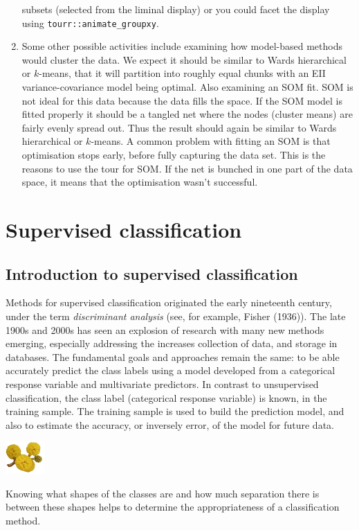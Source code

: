 \documentclass[
  letterpaper,
]{krantz}
\newcommand{\infobox}[1]{%
\noindent\colorbox{info!30}{%
\begin{minipage}{0.98\linewidth}%
    \centering%
    \begin{minipage}[c]{0.15\linewidth} %
      \includegraphics[width=1.5cm]{images/mulga-flowers2.png} %
    \end{minipage}%
    \hfill %
    \begin{minipage}[c]{0.8\linewidth} %
      \bigskip%
      \textsf{#1}%
      \bigskip%
    \end{minipage}%
    \hspace*{3mm}%
  \end{minipage}%
}%
}
\begin{document}
\begin{enumerate}
  subsets (selected from the liminal display) or you could facet the
  display using \texttt{tourr::animate\_groupxy}.
\item
  Some other possible activities include examining how model-based
  methods would cluster the data. We expect it should be similar to
  Wards hierarchical or \(k\)-means, that it will partition into roughly
  equal chunks with an EII variance-covariance model being optimal. Also
  examining an SOM fit. SOM is not ideal for this data because the data
  fills the space. If the SOM model is fitted properly it should be a
  tangled net where the nodes (cluster means) are fairly evenly spread
  out. Thus the result should again be similar to Wards hierarchical or
  \(k\)-means. A common problem with fitting an SOM is that optimisation
  stops early, before fully capturing the data set. This is the reasons
  to use the tour for SOM. If the net is bunched in one part of the data
  space, it means that the optimisation wasn't successful.
\end{enumerate}

\part{Supervised classification}

\chapter{Introduction to supervised
classification}\label{introduction-to-supervised-classification}

Methods for supervised classification originated the early nineteenth
century, under the term \emph{discriminant analysis} (see, for example,
Fisher (1936)). The late 1900s and 2000s has seen an explosion of
research with many new methods emerging, especially addressing the
increases collection of data, and storage in databases. The fundamental
goals and approaches remain the same: to be able accurately predict the
class labels using a model developed from a categorical response
variable and multivariate predictors. In contrast to unsupervised
classification, the class label (categorical response variable) is
known, in the training sample. The training sample is used to build the
prediction model, and also to estimate the accuracy, or inversely error,
of the model for future data.

\infobox{Knowing what shapes of the classes are and how much separation there is between these shapes helps to determine the appropriateness of a classification method.}
\end{document}
